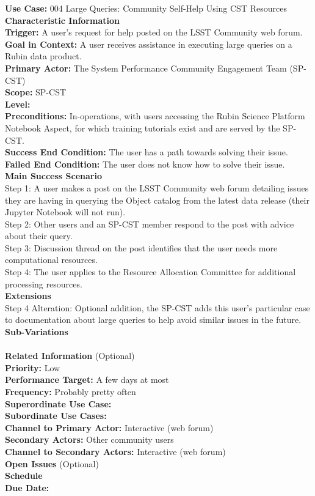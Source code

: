 \textbf{Use Case:} 004 Large Queries: Community Self-Help Using CST Resources \\

\textbf{Characteristic Information} \\
\textbf{Trigger:} A user's request for help posted on the LSST Community web forum. \\
\textbf{Goal in Context:} A user receives assistance in executing large queries on a Rubin data product. \\
\textbf{Primary Actor:} The System Performance Community Engagement Team (SP-CST) \\
\textbf{Scope:} SP-CST \\
\textbf{Level:} \\
\textbf{Preconditions:} In-operations, with users accessing the Rubin Science Platform Notebook Aspect, for which training tutorials exist and are served by the SP-CST. \\
\textbf{Success End Condition:} The user has a path towards solving their issue. \\
\textbf{Failed End Condition:} The user does not know how to solve their issue. \\

\textbf{Main Success Scenario} \\
Step 1: A user makes a post on the LSST Community web forum detailing issues they are having in querying the Object catalog from the latest data release (their Jupyter Notebook will not run). \\
Step 2: Other users and an SP-CST member respond to the post with advice about their query. \\
Step 3: Discussion thread on the post identifies that the user needs more computational resources. \\
Step 4: The user applies to the Resource Allocation Committee for additional processing resources. \\

\textbf{Extensions} \\
Step 4 Alteration: Optional addition, the SP-CST adds this user's particular case to documentation about large queries to help avoid similar issues in the future. \\

\textbf{Sub-Variations} \\
\\

\textbf{Related Information} (Optional) \\
\textbf{Priority:} Low \\
\textbf{Performance Target:} A few days at most \\
\textbf{Frequency:} Probably pretty often \\
\textbf{Superordinate Use Case:} \\
\textbf{Subordinate Use Cases:} \\
\textbf{Channel to Primary Actor:} Interactive (web forum) \\
\textbf{Secondary Actors:} Other community users \\
\textbf{Channel to Secondary Actors:} Interactive (web forum) \\

\textbf{Open Issues} (Optional) \\

\textbf{Schedule} \\
\textbf{Due Date:} \\
